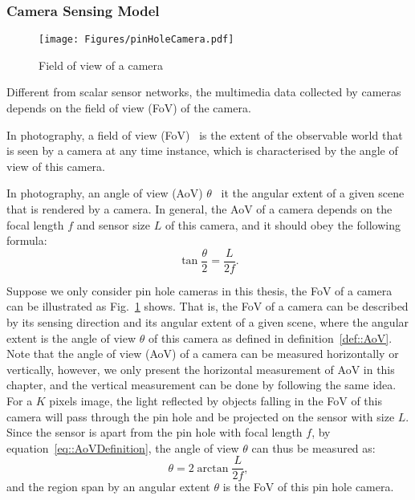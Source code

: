 \subsubsection{Camera Sensing Model}
\begin{figure}
\begin{center}
\texttt{[image: Figures/pinHoleCamera.pdf]}
\caption{\label{fig::fov}Field of view of a camera}
\end{center}
\end{figure}
Different from scalar sensor networks, the multimedia data collected by cameras depends on the field of view (FoV) of the camera.
\begin{mydef}
In photography, a field of view (FoV)~\cite{szeliski2010computer} is the extent of the observable world that is seen by a camera at any time instance, which is characterised by the angle of view of this camera.
\label{def::FoV}
\end{mydef}
\begin{mydef}
In photography, an angle of view (AoV) $\theta$~\cite{szeliski2010computer} it the angular extent of a given scene that is rendered by a camera.
In general, the AoV of a camera depends on the focal length $f$ and sensor size $L$ of this camera, and it should obey the following formula:
\begin{equation}
\tan \frac{\theta}{2} = \frac{L}{2f}.
\label{eq::AoVDefinition}
\end{equation}
\label{def::AoV}
\end{mydef}
Suppose we only consider pin hole cameras in this thesis, the FoV of a camera can be illustrated as Fig.~\ref{fig::fov} shows.
That is, the FoV of a camera can be described by its sensing direction and its angular extent of a given scene, where the angular extent is the angle of view $\theta$ of this camera as defined in definition~\ref{def::AoV}.
Note that the angle of view (AoV) of a camera can be measured horizontally or vertically, however, we only present the horizontal measurement of AoV in this chapter, and the vertical measurement can be done by following the same idea.
For a $K$ pixels image, the light reflected by objects falling in the FoV of this camera will pass through the pin hole and be projected on the sensor with size $L$.
Since the sensor is apart from the pin hole with focal length $f$, by equation~\eqref{eq::AoVDefinition}, the angle of view $\theta$ can thus be measured as:
\begin{equation}
\theta = 2 \arctan \frac{L}{2f},
\label{eq::AoV}
\end{equation}
and the region span by an angular extent $\theta$ is the FoV of this pin hole camera.
%
